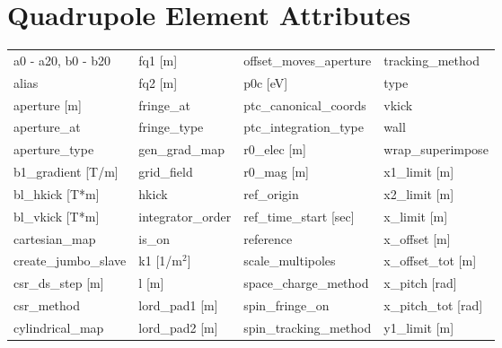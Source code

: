  \section{Quadrupole Element Attributes}
 \label{s:list.quadrupole}
 
 \begin{tabular}{llll} \toprule
a0 - a20, b0 - b20               & fq1 [m]                          & offset_moves_aperture            & tracking_method                  \\
alias                            & fq2 [m]                          & p0c [eV]                         & type                             \\
aperture [m]                     & fringe_at                        & ptc_canonical_coords             & vkick                            \\
aperture_at                      & fringe_type                      & ptc_integration_type             & wall                             \\
aperture_type                    & gen_grad_map                     & r0_elec [m]                      & wrap_superimpose                 \\
b1_gradient [T/m]                & grid_field                       & r0_mag [m]                       & x1_limit [m]                     \\
bl_hkick [T*m]                   & hkick                            & ref_origin                       & x2_limit [m]                     \\
bl_vkick [T*m]                   & integrator_order                 & ref_time_start [sec]             & x_limit [m]                      \\
cartesian_map                    & is_on                            & reference                        & x_offset [m]                     \\
create_jumbo_slave               & k1 [1/m$^2$]                     & scale_multipoles                 & x_offset_tot [m]                 \\
csr_ds_step [m]                  & l [m]                            & space_charge_method              & x_pitch [rad]                    \\
csr_method                       & lord_pad1 [m]                    & spin_fringe_on                   & x_pitch_tot [rad]                \\
cylindrical_map                  & lord_pad2 [m]                    & spin_tracking_method             & y1_limit [m]                     \\

\end{tabular}
